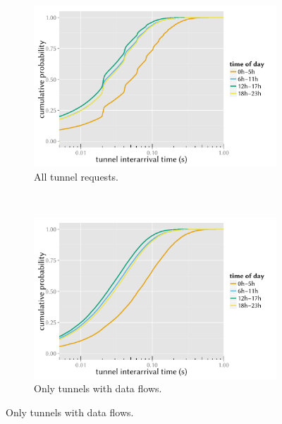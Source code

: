 \begin{figure}[htb]
	\centering
	\begin{subfigure}[b]{0.5\textwidth}    
		\includegraphics[width=\textwidth]{images/R-IAT-successful-2h-ecdfs.pdf}
		\caption{All tunnel requests.}
		\label{c4:fig:IAT-ecdf-2h-successful}
	\end{subfigure}%
	~
		\begin{subfigure}[b]{0.5\textwidth}
		\includegraphics[width=\textwidth]{images/R-IAT-fromflows-ecdfs-2h.pdf}
		\caption{Only tunnels with data flows.}
		\label{c4:fig:IAT-ecdf-2h-active}
	\end{subfigure}


\end{figure}
